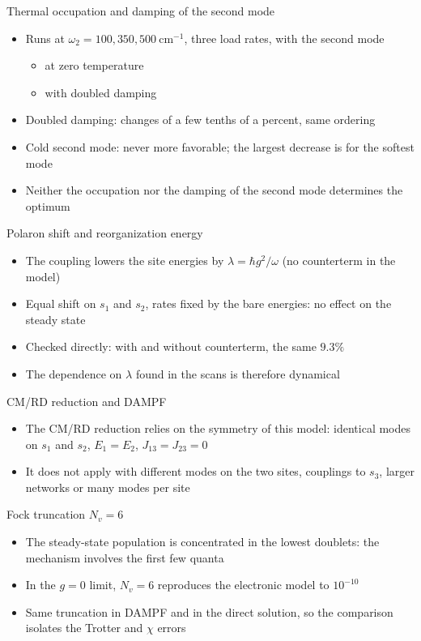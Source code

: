 \documentclass[aspectratio=169,11pt]{beamer}
\begin{document}
\begin{frame}{Thermal occupation and damping of the second mode}
  \begin{itemize}\setlength\itemsep{0.8em}
    \item Runs at $\omega_2=100,350,500~\mathrm{cm^{-1}}$, three load rates, with the second mode
      \begin{itemize}
        \item at zero temperature
        \item with doubled damping
      \end{itemize}
    \item Doubled damping: changes of a few tenths of a percent, same ordering
    \item Cold second mode: never more favorable; the largest decrease is for the softest mode
    \item Neither the occupation nor the damping of the second mode determines the optimum
  \end{itemize}
\end{frame}

\begin{frame}{Polaron shift and reorganization energy}
  \begin{itemize}\setlength\itemsep{0.8em}
    \item The coupling lowers the site energies by $\lambda=\hbar g^2/\omega$ (no counterterm in the model)
    \item Equal shift on $s_1$ and $s_2$, rates fixed by the bare energies: no effect on the steady state
    \item Checked directly: with and without counterterm, the same $9.3\%$
    \item The dependence on $\lambda$ found in the scans is therefore dynamical
  \end{itemize}
\end{frame}

\begin{frame}{CM/RD reduction and DAMPF}
  \begin{itemize}\setlength\itemsep{0.8em}
    \item The CM/RD reduction relies on the symmetry of this model: identical modes on $s_1$ and $s_2$, $E_1=E_2$, $J_{13}=J_{23}=0$
    \item It does not apply with different modes on the two sites, couplings to $s_3$, larger networks or many modes per site
  \end{itemize}
\end{frame}

\begin{frame}{Fock truncation $N_v=6$}
  \begin{itemize}\setlength\itemsep{0.8em}
    \item The steady-state population is concentrated in the lowest doublets: the mechanism involves the first few quanta
    \item In the $g=0$ limit, $N_v=6$ reproduces the electronic model to $10^{-10}$
    \item Same truncation in DAMPF and in the direct solution, so the comparison isolates the Trotter and $\chi$ errors
  \end{itemize}
\end{frame}
\end{document}

